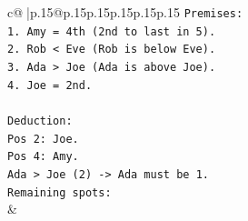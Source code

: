 \documentclass{article}
\begin{document}
{\begin{supertabular}{c@{$\;$}|p{.15\linewidth}@{}p{.15\linewidth}p{.15\linewidth}p{.15\linewidth}p{.15\linewidth}p{.15\linewidth}}
{{{\texttt{Premises:} \\
\texttt{1. Amy = 4th (2nd to last in 5).} \\
\texttt{2. Rob < Eve (Rob is below Eve).} \\
\texttt{3. Ada > Joe (Ada is above Joe).} \\
\texttt{4. Joe = 2nd.} \\
\\ 
\texttt{Deduction:} \\
\texttt{Pos 2: Joe.} \\
\texttt{Pos 4: Amy.} \\
\texttt{Ada > Joe (2) {-}> Ada must be 1.} \\
\texttt{Remaining spots:} \\
            }
        }
    }
    & \\ \\

\end{supertabular}
}
\end{document}
